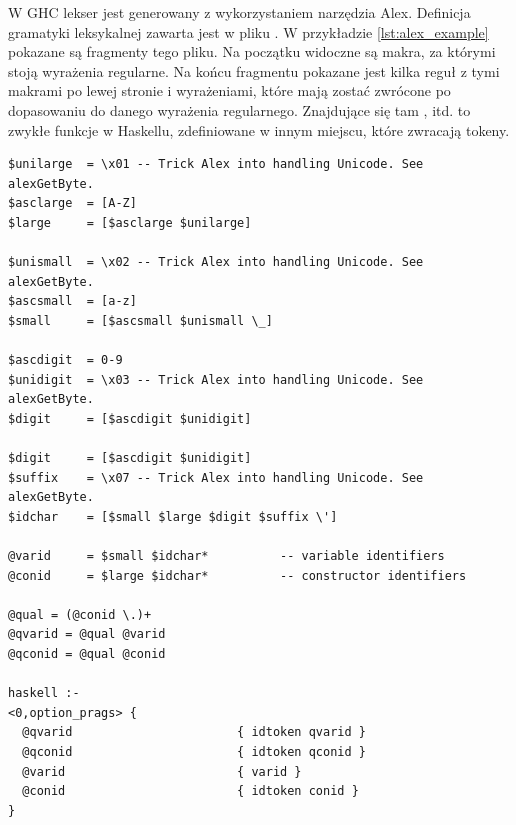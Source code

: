 W GHC lekser jest generowany z wykorzystaniem narzędzia Alex. Definicja
gramatyki leksykalnej zawarta jest w pliku . W przykładzie
\ref{lst:alex_example} pokazane są fragmenty tego pliku. Na początku widoczne są
makra, za którymi stoją wyrażenia regularne. Na końcu fragmentu pokazane jest
kilka reguł z tymi makrami po lewej stronie i wyrażeniami, które mają zostać
zwrócone po dopasowaniu do danego wyrażenia regularnego. Znajdujące się tam
,  itd. to zwykłe funkcje w Haskellu, zdefiniowane w
innym miejscu, które zwracają tokeny\cite{DocsAlex}.

\begin{lstlisting}[float,label={lst:alex_example},
                   caption={Wycinki z pliku \code{Lexer.x} składające się na reguły opisujące co jest wyodrębniane jako zmienna i konstruktor.}]
$unilarge  = \x01 -- Trick Alex into handling Unicode. See alexGetByte.
$asclarge  = [A-Z]
$large     = [$asclarge $unilarge]

$unismall  = \x02 -- Trick Alex into handling Unicode. See alexGetByte.
$ascsmall  = [a-z]
$small     = [$ascsmall $unismall \_]

$ascdigit  = 0-9
$unidigit  = \x03 -- Trick Alex into handling Unicode. See alexGetByte.
$digit     = [$ascdigit $unidigit]

$digit     = [$ascdigit $unidigit]
$suffix    = \x07 -- Trick Alex into handling Unicode. See alexGetByte.
$idchar    = [$small $large $digit $suffix \']

@varid     = $small $idchar*          -- variable identifiers
@conid     = $large $idchar*          -- constructor identifiers

@qual = (@conid \.)+
@qvarid = @qual @varid
@qconid = @qual @conid

haskell :-
<0,option_prags> {
  @qvarid                       { idtoken qvarid }
  @qconid                       { idtoken qconid }
  @varid                        { varid }
  @conid                        { idtoken conid }
}
\end{lstlisting}

